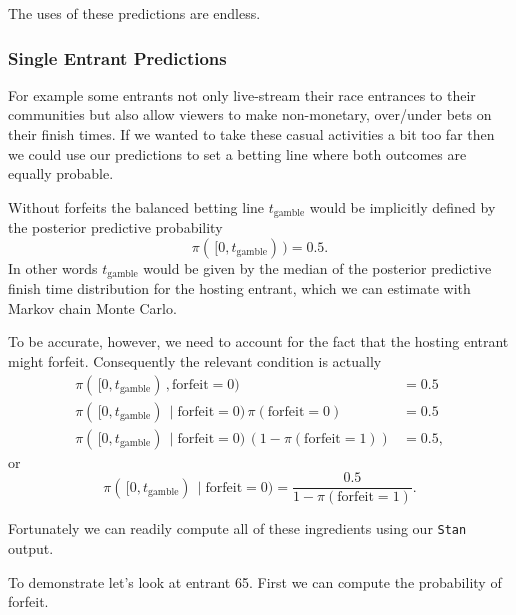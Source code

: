 \documentclass[
  letterpaper,
  DIV=11,
  numbers=noendperiod]{scrartcl}
\newenvironment{Shaded}{\begin{snugshade}}{\end{snugshade}}
\newcommand{\DecValTok}[1]{\textcolor[rgb]{0.68,0.00,0.00}{#1}}
\newcommand{\FunctionTok}[1]{\textcolor[rgb]{0.28,0.35,0.67}{#1}}
\newcommand{\NormalTok}[1]{\textcolor[rgb]{0.00,0.23,0.31}{#1}}
\newcommand{\OtherTok}[1]{\textcolor[rgb]{0.00,0.23,0.31}{#1}}
\newcommand{\SpecialCharTok}[1]{\textcolor[rgb]{0.37,0.37,0.37}{#1}}
\newcommand{\StringTok}[1]{\textcolor[rgb]{0.13,0.47,0.30}{#1}}
\begin{document}
The uses of these predictions are endless.

\subsubsection{Single Entrant
Predictions}\label{single-entrant-predictions}

For example some entrants not only live-stream their race entrances to
their communities but also allow viewers to make non-monetary,
over/under bets on their finish times. If we wanted to take these casual
activities a bit too far then we could use our predictions to set a
betting line where both outcomes are equally probable.

Without forfeits the balanced betting line \(t_{\mathrm{gamble}}\) would
be implicitly defined by the posterior predictive probability \[
\pi( \, [ 0, t_{\mathrm{gamble}} ) \, ) = 0.5.
\] In other words \(t_{\mathrm{gamble}}\) would be given by the median
of the posterior predictive finish time distribution for the hosting
entrant, which we can estimate with Markov chain Monte Carlo.

To be accurate, however, we need to account for the fact that the
hosting entrant might forfeit. Consequently the relevant condition is
actually \begin{align*}
\pi( \, [ 0, t_{\mathrm{gamble}} ) \, , \mathrm{forfeit} = 0 )
&=
0.5
\\
\pi( \, [ 0, t_{\mathrm{gamble}} ) \, \mid \mathrm{forfeit} = 0 ) \,
\pi( \mathrm{forfeit} = 0 )
&=
0.5
\\
\pi( \, [ 0, t_{\mathrm{gamble}} ) \, \mid \mathrm{forfeit} = 0 ) \,
\left( 1 - \pi( \mathrm{forfeit} = 1 ) \right)
&=
0.5,
\end{align*} or \[
\pi( \, [ 0, t_{\mathrm{gamble}} ) \, \mid \mathrm{forfeit} = 0 )
=
\frac{0.5}{ 1 - \pi( \mathrm{forfeit} = 1 ) }.
\]

Fortunately we can readily compute all of these ingredients using our
\texttt{Stan} output.

To demonstrate let's look at entrant 65. First we can compute the
probability of forfeit.

\begin{Shaded}
\end{Shaded}
\end{document}
